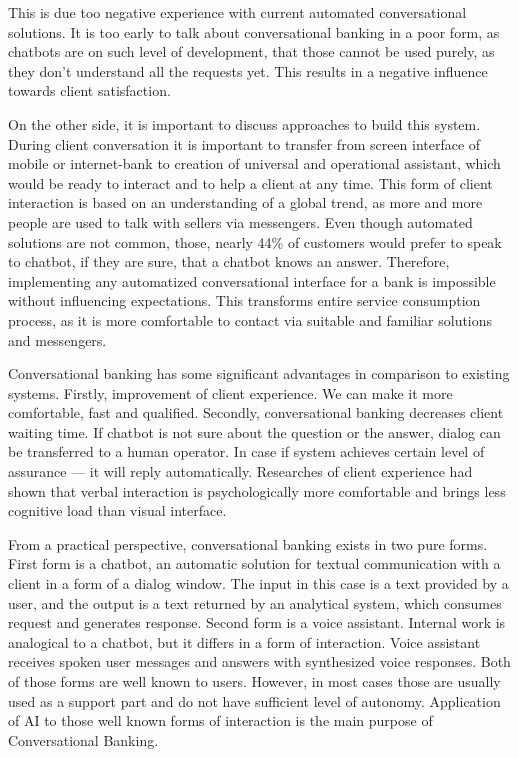 This is due too negative experience with current automated conversational solutions.
It is too early to talk about conversational banking in a poor form, as chatbots are on such level of development, that those cannot be used purely, as they don't understand all the requests yet.
This results in a negative influence towards client satisfaction.

On the other side, it is important to discuss approaches to build this system.
During client conversation it is important to transfer from screen interface of mobile or internet-bank to creation of universal and operational assistant, which would be ready to interact and to help a client at any time.
This form of client interaction is based on an understanding of a global trend, as more and more people are used to talk with sellers via messengers.
Even though automated solutions are not common, those, nearly 44\% of customers would prefer to speak to chatbot, if they are sure, that a chatbot knows an answer.
\cite{humley_banking_report}
Therefore, implementing any automatized conversational interface for a bank is impossible without influencing expectations.
This transforms entire service consumption process, as it is more comfortable to contact via suitable and familiar solutions and messengers.

Conversational banking has some significant advantages in comparison to existing systems.
Firstly, improvement of client experience. 
We can make it more comfortable, fast and qualified.
Secondly, conversational banking decreases client waiting time. 
If chatbot is not sure about the question or the answer, dialog can be transferred to a human operator.
In case if system achieves certain level of assurance — it will reply automatically.
Researches of client experience had shown that verbal interaction is psychologically more comfortable and brings less cognitive load than visual interface.
\cite{accenture_conversational_banking}

From a practical perspective, conversational banking exists in two pure forms.
First form is a chatbot, an automatic solution for textual communication with a client in a form of a dialog window.
The input in this case is a text provided by a user, and the output is a text returned by an analytical system, which consumes request and generates response.
Second form is a voice assistant. Internal work is analogical to a chatbot, but it differs in a form of interaction.
Voice assistant receives spoken user messages and answers with synthesized voice responses.
Both of those forms are well known to users.
However, in most cases those are usually used as a support part and do not have sufficient level of autonomy.
Application of AI to those well known forms of interaction is the main purpose of Conversational Banking.

